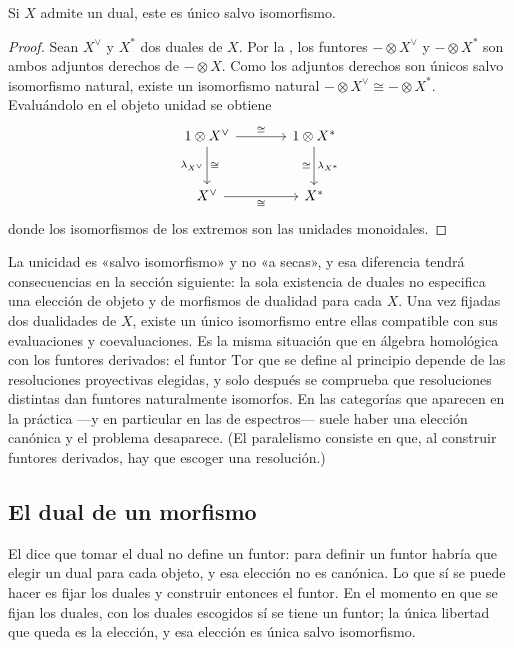 \begin{coro}\label{coro:unicidad-dual}
Si $X$ admite un dual, este es único salvo isomorfismo.
\end{coro}
\begin{proof}
Sean $X^\vee$ y $X^*$ dos duales de $X$. Por la , los funtores $-\otimes X^\vee$ y $-\otimes X^*$ son ambos adjuntos derechos de $-\otimes X$. Como los adjuntos derechos son únicos salvo isomorfismo natural, existe un isomorfismo natural $-\otimes X^\vee\cong-\otimes X^*$. Evaluándolo en el objeto unidad se obtiene
\[
\begin{tikzcd}[column sep=large,row sep=large]
1\otimes X^\vee \arrow[r,"{\cong}"] \arrow[d,"{\lambda_{X^\vee}}"',"{\cong}"]
 &1\otimes X^* \arrow[d,"{\lambda_{X^*}}","{\cong}"']\\
X^\vee \arrow[r,"{\cong}"'] &X^*
\end{tikzcd}
\]
donde los isomorfismos de los extremos son las unidades monoidales.
\end{proof}

\begin{nota}
   La unicidad es «salvo isomorfismo» y no «a secas», y esa diferencia tendrá consecuencias en la sección siguiente: la sola existencia de duales no especifica una elección de objeto y de morfismos de dualidad para cada $X$. Una vez fijadas dos dualidades de $X$, existe un único isomorfismo entre ellas compatible con sus evaluaciones y coevaluaciones. Es la misma situación que en álgebra homológica con los funtores derivados: el funtor $\mathrm{Tor}$ que se define al principio depende de las resoluciones proyectivas elegidas, y solo después se comprueba que resoluciones distintas dan funtores naturalmente isomorfos. En las categorías que aparecen en la práctica —y en particular en las de espectros— suele haber una elección canónica y el problema desaparece. (El paralelismo consiste en que, al construir funtores derivados, hay que escoger una resolución.)
\end{nota}

\subsection{El dual de un morfismo}

El  dice que tomar el dual no define un funtor: para definir un funtor habría que elegir un dual para cada objeto, y esa elección no es canónica. Lo que sí se puede hacer es fijar los duales y construir entonces el funtor. En el momento en que se fijan los duales, con los duales escogidos sí se tiene un funtor; la única libertad que queda es la elección, y esa elección es única salvo isomorfismo.

